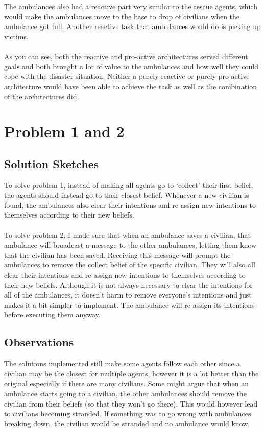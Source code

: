 \documentclass[titlepage]{article}
\begin{document}
  \\ \\
  The ambulances also had a reactive part very similar to the rescue agents, which would make the ambulances move to the base to drop of civilians when the ambulance got full. Another reactive task that ambulances would do is picking up victims.
  \\ \\
  As you can see, both the reactive and pro-active architectures served different goals and both brought a lot of value to the ambulances and how well they could cope with the disaster situation. Neither a purely reactive or purely pro-active architecture would have been able to achieve the task as well as the combination of the architectures did.

\section{Problem 1 and 2}
  \subsection{Solution Sketches}
    To solve problem 1, instead of making all agents go to `collect' their first belief, the agents should instead go to their closest belief. Whenever a new civilian is found, the ambulances also clear their intentions and re-assign new intentions to themselves according to their new beliefs.
    \\ \\
    To solve problem 2, I made sure that when an ambulance saves a civilian, that ambulance will broadcast a message to the other ambulances, letting them know that the civilian has been saved. Receiving this message will prompt the ambulances to remove the collect belief of the specific civilian. They will also all clear their intentions and re-assign new intentions to themselves according to their new beliefs. Although it is not always necessary to clear the intentions for all of the ambulances, it doesn't harm to remove everyone's intentions and just makes it a bit simpler to implement. The ambulance will re-assign its intentions before executing them anyway.
    
  \subsection{Observations}
    The solutions implemented still make some agents follow each other since a civilian may be the closest for multiple agents, however it is a lot better than the original especially if there are many civilians. Some might argue that when an ambulance starts going to a civilian, the other ambulances should remove the civilian from their beliefs (so that they won't go there). This would however lead to civilians becoming stranded. If something was to go wrong with ambulances breaking down, the civilian would be stranded and no ambulance would know.
\end{document}
